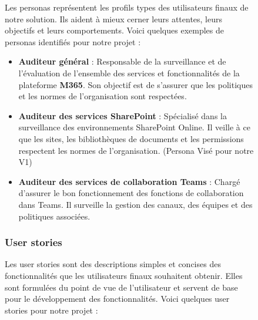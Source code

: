 \begin{figure}[H]
Les personas représentent les profils types des utilisateurs finaux de notre solution. Ils aident à mieux cerner leurs attentes, leurs objectifs et leurs comportements. Voici quelques exemples de personas identifiés pour notre projet :

\begin{itemize}
    \item \textbf{Auditeur général} : Responsable de la surveillance et de l'évaluation de l'ensemble des services et fonctionnalités de la plateforme \textbf{M365}. Son objectif est de s'assurer que les politiques et les normes de l'organisation sont respectées.
    \item \textbf{Auditeur des services SharePoint} : Spécialisé dans la surveillance des environnements SharePoint Online. Il veille à ce que les sites, les bibliothèques de documents et les permissions respectent les normes de l'organisation. (Persona Visé pour notre V1)
    \item \textbf{Auditeur des services de collaboration Teams} : Chargé d'assurer le bon fonctionnement des fonctions de collaboration dans Teams. Il surveille la gestion des canaux, des équipes et des politiques associées.
\end{itemize}

\subsubsection{User stories}

Les user stories sont des descriptions simples et concises des fonctionnalités que les utilisateurs finaux souhaitent obtenir. Elles sont formulées du point de vue de l'utilisateur et servent de base pour le développement des fonctionnalités. Voici quelques user stories pour notre projet :


\end{figure}
